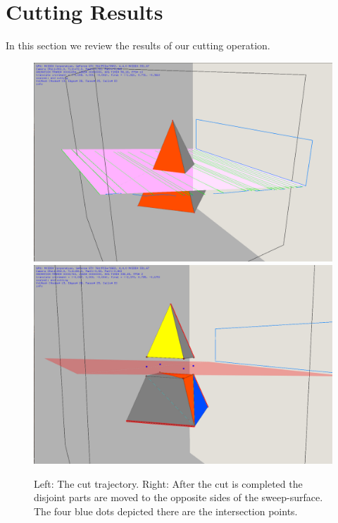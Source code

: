 \section{Cutting Results}
In this section we review the results of our cutting operation. 

\begin{figure}[H]
  \centering
  \includegraphics[width=0.4\linewidth]{figures/cutting/beforecut.png}
  \includegraphics[width=0.4\linewidth]{figures/cutting/aftercut.png}
  \caption{\label{fig:twotetsexample}
  {Left: The cut trajectory. Right: After the cut is completed the disjoint parts are moved to the opposite sides of the sweep-surface.
  The four blue dots depicted there are the intersection points.}
}
\end{figure}
